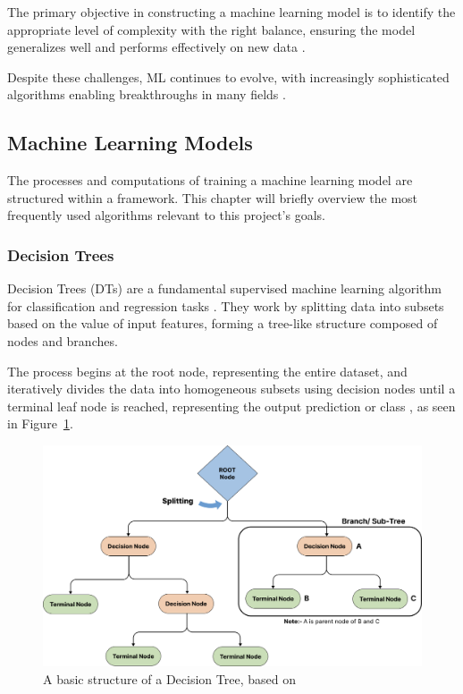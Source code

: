 The primary objective in constructing a machine learning model is to identify the appropriate level of complexity with the right balance, ensuring the model generalizes well and performs effectively on new data \parencite{Suthaharan2016}.

Despite these challenges, \gls{ML} continues to evolve, with increasingly sophisticated algorithms enabling breakthroughs in many fields \parencite{Mohri2012}. 

\subsection{Machine Learning Models}

The processes and computations of training a machine learning model are structured within a framework. 
This chapter will briefly overview the most frequently used algorithms relevant to this project's goals.

\subsubsection{Decision Trees}

Decision Trees (DTs) are a fundamental supervised machine learning algorithm for classification and regression tasks \parencite{Huang2024}. 
They work by splitting data into subsets based on the value of input features, forming a tree-like structure composed of nodes and branches.

The process begins at the root node, representing the entire dataset, and iteratively divides the data into homogeneous subsets using decision nodes until a terminal leaf node is reached, representing the output prediction or class \parencite{Chauhan2022}, as seen in Figure~\ref{fig:struc-DT}.

\begin{figure}[h]
    \centering
    \includegraphics[width=\textwidth]{ch2/assets/FinalTreeGraph.png}
    \caption{A basic structure of a Decision Tree, based on \parencite{Chauhan2022}}
    \label{fig:struc-DT}
\end{figure}

